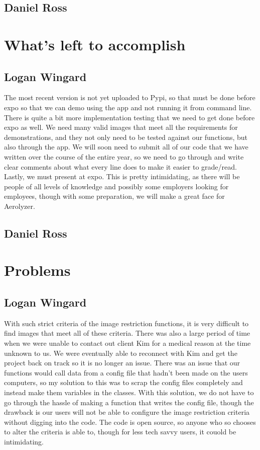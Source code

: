 \documentclass[onecolumn, draftclsnofoot,10pt, compsoc]{IEEEtran}
\begin{document}
\begin{singlespace}
		\subsection{Daniel Ross}
			
			
			
	\section{What's left to accomplish}
		
		\subsection{Logan Wingard}
			The most recent version is not yet uploaded to Pypi, so that must be done before expo so that we can demo using the app and not running it from command line.
			There is quite a bit more implementation testing that we need to get done before expo as well.
			We need many valid images that meet all the requirements for demonstrations, and they not only need to be tested against our functions, but also through the app.
			We will soon need to submit all of our code that we have written over the course of the entire year, so we need to go through and write clear comments about what every line does to make it easier to grade/read.
			Lastly, we must present at expo.
			This is pretty intimidating, as there will be people of all levels of knowledge and possibly some employers looking for employees, though with some preparation, we will make a great face for Aerolyzer.
		\subsection{Daniel Ross}
			


	\section{Problems}
		
		\subsection{Logan Wingard}
			With such strict criteria of the image restriction functions, it is very difficult to find images that meet all of these criteria.
			There was also a large period of time when we were unable to contact out client Kim for a medical reason at the time unknown to us.
			We were eventually able to reconnect with Kim and get the project back on track so it is no longer an issue.
			There was an issue that our functions would call data from a config file that hadn't been made on the users computers, so my solution to this was to scrap the config files completely and instead make them variables in the classes.
			With this solution, we do not have to go through the hassle of making a function that writes the config file, though the drawback is our users will not be able to configure the image restriction criteria without digging into the code.
			The code is open source, so anyone who so chooses to alter the criteria is able to, though for less tech savvy users, it couold be intimidating. 

\end{singlespace}
\end{document}
